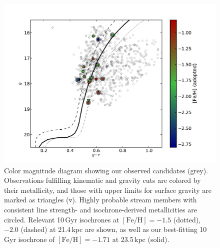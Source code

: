\documentclass{emulateapj}
\begin{document}
\begin{figure}[h]
	\includegraphics[width=\columnwidth]{./figures/cmd.pdf}
	\caption{Color magnitude diagram showing our observed candidates (grey). Observations fulfilling kinematic and gravity cuts are colored by their metallicity, and those with upper limits for surface gravity are marked as triangles ($\triangledown$). Highly probable stream members with consistent line strength- and isochrone-derived metallicities are circled. Relevant 10\,Gyr \citet{Girardi;et-al_2008} isochrones at $[\mbox{Fe/H}] = -1.5$ (dotted), $-2.0$ (dashed) at 21.4\,kpc \citep{Newberg;et-al_2010} are shown, as well as our best-fitting 10\,Gyr isochrone of $[\mbox{Fe/H}] = -1.71$ at 23.5\,kpc (solid).}
	\label{fig:cmd}
\end{figure}
\end{document}

